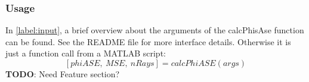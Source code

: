 \subsubsection{Usage}
In \ref{label:input}, a brief overview about the
arguments of the calcPhisAse function can be found. See the README file for 
more interface details. Otherwise it is just a function call from
a MATLAB script:
\[[phiASE,~MSE,~nRays] = calcPhiASE(args)\]
\textbf{TODO}: Need Feature section?

